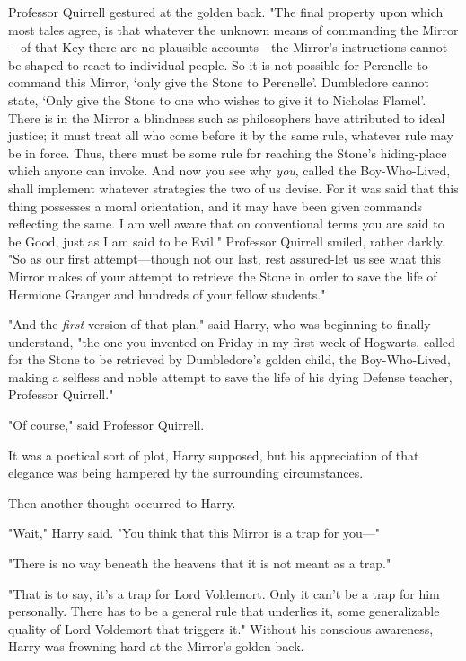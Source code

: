 Professor Quirrell gestured at the golden back. "The final property upon which 
most tales agree, is that whatever the unknown means of commanding the 
Mirror---of that Key there are no plausible accounts---the Mirror's 
instructions cannot be shaped to react to individual people. So it is not 
possible for Perenelle to command this Mirror, `only give the Stone to 
Perenelle'. Dumbledore cannot state, `Only give the Stone to one who wishes to 
give it to Nicholas Flamel'. There is in the Mirror a blindness such as 
philosophers have attributed to ideal justice; it must treat all who come 
before it by the same rule, whatever rule may be in force. Thus, there must be 
some rule for reaching the Stone's hiding-place which anyone can invoke. And 
now you see why \emph{you}, called the Boy-Who-Lived, shall implement whatever 
strategies the two of us devise. For it was said that this thing possesses a 
moral orientation, and it may have been given commands reflecting the same. I 
am well aware that on conventional terms you are said to be Good, just as I am 
said to be Evil." Professor Quirrell smiled, rather darkly. "So as our first 
attempt---though not our last, rest assured-let us see what this Mirror makes 
of your attempt to retrieve the Stone in order to save the life of Hermione 
Granger and hundreds of your fellow students."

"And the \emph{first} version of that plan," said Harry, who was beginning to 
finally understand, "the one you invented on Friday in my first week of 
Hogwarts, called for the Stone to be retrieved by Dumbledore's golden child, 
the Boy-Who-Lived, making a selfless and noble attempt to save the life of his 
dying Defense teacher, Professor Quirrell."

"Of course," said Professor Quirrell.

It was a poetical sort of plot, Harry supposed, but his appreciation of that 
elegance was being hampered by the surrounding circumstances.

Then another thought occurred to Harry.

"Wait," Harry said. "You think that this Mirror is a trap for you---"

"There is no way beneath the heavens that it is not meant as a trap."

"That is to say, it's a trap for Lord Voldemort. Only it can't be a trap for 
him personally. There has to be a general rule that underlies it, some 
generalizable quality of Lord Voldemort that triggers it." Without his 
conscious awareness, Harry was frowning hard at the Mirror's golden back.

